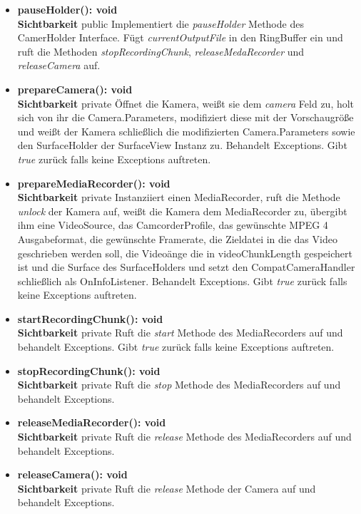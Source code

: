 \begin{itemize}
\item \textbf{pauseHolder(): void}\hfill\\
\textbf{Sichtbarkeit} public\newline
Implementiert die \textit{pauseHolder} Methode des CamerHolder Interface. Fügt \textit{currentOutputFile} in den RingBuffer ein und ruft die Methoden \textit{stopRecordingChunk}, \textit{releaseMedaRecorder} und \textit{releaseCamera} auf.

\item \textbf{prepareCamera(): void}\hfill\\
\textbf{Sichtbarkeit} private \newline
Öffnet die Kamera, weißt sie dem \textit{camera} Feld zu, holt sich von ihr die Camera.Parameters, modifiziert diese mit der Vorschaugröße und weißt der Kamera schließlich die modifizierten Camera.Parameters sowie den SurfaceHolder der SurfaceView Instanz zu. Behandelt Exceptions. Gibt \textit{true} zurück falls keine Exceptions auftreten.

\item \textbf{prepareMediaRecorder(): void}\hfill\\
\textbf{Sichtbarkeit} private \newline
Instanziiert einen MediaRecorder, ruft die Methode \textit{unlock} der Kamera auf, weißt die Kamera dem MediaRecorder zu, übergibt ihm eine VideoSource, das CamcorderProfile, das gewünschte MPEG 4 Ausgabeformat, die gewünschte Framerate, die Zieldatei in die das Video geschrieben werden soll, die Videoänge die in videoChunkLength gespeichert ist und die Surface des SurfaceHolders und setzt den CompatCameraHandler schließlich als OnInfoListener. Behandelt Exceptions. Gibt \textit{true} zurück falls keine Exceptions auftreten.

\item \textbf{startRecordingChunk(): void}\hfill\\
\textbf{Sichtbarkeit} private \newline
Ruft die \textit{start} Methode des MediaRecorders auf und behandelt Exceptions. Gibt \textit{true} zurück falls keine Exceptions auftreten.

\item \textbf{stopRecordingChunk(): void}\hfill\\
\textbf{Sichtbarkeit} private \newline
Ruft die \textit{stop} Methode des MediaRecorders auf und behandelt Exceptions.

\item \textbf{releaseMediaRecorder(): void}\hfill\\
\textbf{Sichtbarkeit} private \newline
Ruft die \textit{release} Methode des MediaRecorders auf und behandelt Exceptions.

\item \textbf{releaseCamera(): void}\hfill\\
\textbf{Sichtbarkeit} private \newline
Ruft die \textit{release} Methode der Camera auf und behandelt Exceptions.

\end{itemize}